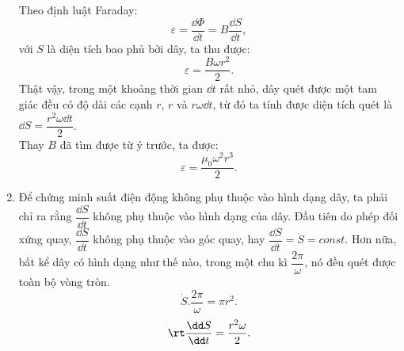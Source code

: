 \begin{loigiai}
\begin{enumerate}[1)]
\begin{center}
        \end{center}
        Theo định luật Faraday:
        \[\varepsilon=\dfrac{\dd\Phi}{\dd t}=B\dfrac{\dd S}{\dd t},\]
        với $S$ là diện tích bao phủ bởi dây, ta thu được:
        \[\varepsilon=\dfrac{B \omega r^2}{2}.\]
        Thật vậy, trong một khoảng thời gian $\dd t$ rất nhỏ, dây quét được một tam giác đều có độ dài các cạnh $r$, $r$ và $r\omega \dd t$, từ đó ta tính được diện tích quét là $\dd S=\dfrac{r^2 \omega \dd t}{2}$.
        \\ Thay $B$ đã tìm được từ ý trước, ta được:
        \[\varepsilon=\dfrac{\mu_0\omega^2 r^3}{2}.\]
        \item Để chứng minh suất điện động không phụ thuộc vào hình dạng dây, ta phải chỉ ra rằng $\dfrac{\dd S}{\dd t}$ không phụ thuộc vào hình dạng của dây. Đầu tiên do phép đối xứng quay, $\dfrac{\dd S}{\dd t}$ không phụ thuộc vào góc quay, hay $\dfrac{\dd S}{\dd t}=\Dot{S}=const$. Hơn nữa, bất kể dây có hình dạng như thế nào, trong một chu kì $\dfrac{2\pi}{\omega}$, nó đều quét được toàn bộ vòng tròn.
        \[\Dot{S}.\dfrac{2\pi}{\omega}=\pi r^2.\]
        \[\rt \dfrac{\dd S}{\dd t}=\dfrac{r^2 \omega}{2}.\]
    \end{enumerate}
\end{loigiai}

